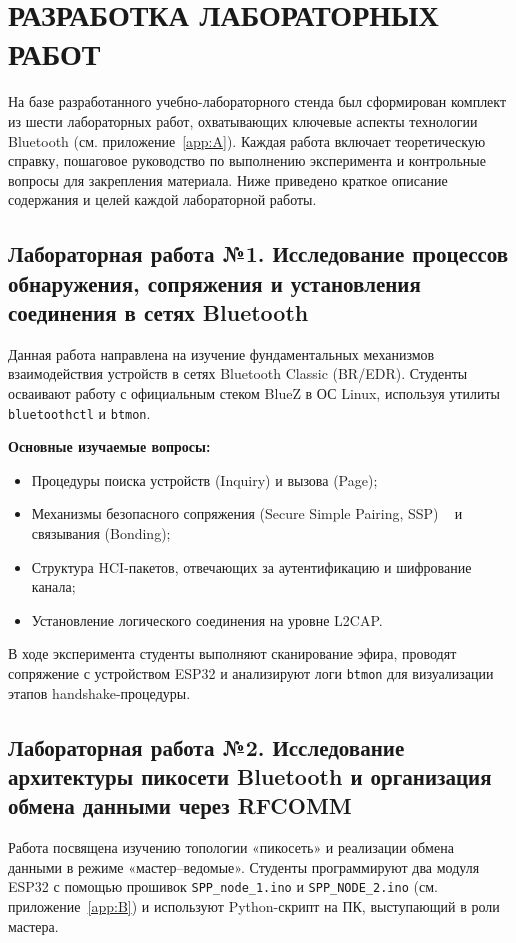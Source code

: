 \section{РАЗРАБОТКА ЛАБОРАТОРНЫХ РАБОТ}

На базе разработанного учебно-лабораторного стенда был сформирован комплект из шести лабораторных работ, охватывающих ключевые аспекты технологии Bluetooth (см. приложение~\ref{app:A}). Каждая работа включает теоретическую справку, пошаговое руководство по выполнению эксперимента и контрольные вопросы для закрепления материала. Ниже приведено краткое описание содержания и целей каждой лабораторной работы.

\subsection{Лабораторная работа №1. Исследование процессов обнаружения, сопряжения и
установления соединения в сетях Bluetooth}
Данная работа направлена на изучение фундаментальных механизмов взаимодействия устройств в сетях Bluetooth Classic (BR/EDR). Студенты осваивают работу с официальным стеком BlueZ в ОС Linux, используя утилиты \texttt{bluetoothctl} и \texttt{btmon}.

\textbf{Основные изучаемые вопросы:}
\begin{itemize}[nosep]
    \item Процедуры поиска устройств (Inquiry) и вызова (Page);
    \item Механизмы безопасного сопряжения (Secure Simple Pairing, SSP) ~\cite{bluetooth_core53} и связывания (Bonding);
    \item Структура HCI-пакетов, отвечающих за аутентификацию и шифрование канала;
    \item Установление логического соединения на уровне L2CAP.
\end{itemize}
В ходе эксперимента студенты выполняют сканирование эфира, проводят сопряжение с устройством ESP32 и анализируют логи \texttt{btmon} для визуализации этапов handshake-процедуры.

\subsection{Лабораторная работа №2. Исследование архитектуры пикосети Bluetooth и организация обмена данными через RFCOMM}
Работа посвящена изучению топологии «пикосеть» и реализации обмена данными в режиме «мастер–ведомые». Студенты программируют два модуля ESP32 с помощью прошивок \texttt{SPP\_node\_1.ino} и \texttt{SPP\_NODE\_2.ino} (см. приложение~\ref{app:B}) и используют Python-скрипт на ПК, выступающий в роли мастера.


